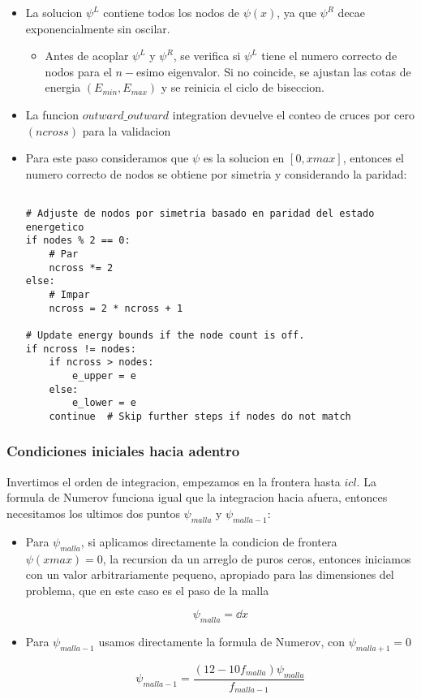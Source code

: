 \documentclass[11pt]{article}
\begin{document}
\begin{itemize}
\item La solucion \(\psi^L\) contiene todos los nodos de \(\psi(x)\), ya que \(\psi^R\) decae exponencialmente sin oscilar.

\begin{itemize}
\item Antes de acoplar \(\psi^L\) y \(\psi^R\), se verifica si \(\psi^L\) tiene el numero correcto de nodos para el \(n-\)esimo eigenvalor. Si no coincide, se ajustan las cotas de energia \((E_{min}, E_{max})\) y se reinicia el ciclo de biseccion.
\end{itemize}

\item La funcion \(outward\_ outward\) integration devuelve el conteo de cruces por cero \((ncross)\) para la validacion

\item Para este paso consideramos que \(\psi\) es la solucion en \([0,xmax]\), entonces el numero correcto de nodos se obtiene por simetria y considerando la paridad:

\begin{verbatim}

# Adjuste de nodos por simetria basado en paridad del estado energetico
if nodes % 2 == 0:
    # Par
    ncross *= 2
else:
    # Impar
    ncross = 2 * ncross + 1

# Update energy bounds if the node count is off.
if ncross != nodes:
    if ncross > nodes:
        e_upper = e
    else:
        e_lower = e
    continue  # Skip further steps if nodes do not match

\end{verbatim}
\end{itemize}
\subsubsection{Condiciones iniciales hacia adentro}
\label{sec:orgfe3c040}

Invertimos el orden de integracion, empezamos en la frontera hasta \(icl\). La formula de Numerov funciona igual que la integracion hacia afuera, entonces necesitamos los ultimos dos puntos \(\psi_{malla}\) y \(\psi_{malla-1}\):

\begin{itemize}
\item Para \(\psi_{malla}\), si aplicamos directamente la condicion de frontera \(\psi(xmax) = 0\), la recursion da un arreglo de puros ceros, entonces iniciamos con un valor arbitrariamente pequeno, apropiado para las dimensiones del problema, que en este caso es el paso de la malla

\[ \psi_{malla} = \dd{x} \]

\item Para \(\psi_{malla-1}\) usamos directamente la formula de Numerov, con \(\psi_{malla + 1} = 0\)

\[ \psi_{malla-1} = \frac{(12-10f_{malla})\psi_{malla}}{f_{malla-1}} \]
\end{itemize}
\end{document}

